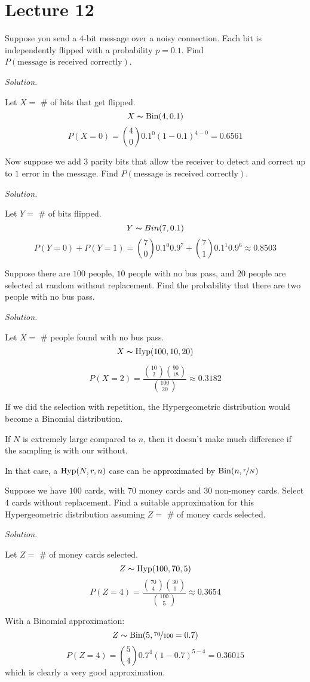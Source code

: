 \section{Lecture 12}

Suppose you send a $ 4 $-bit message over a noisy connection.
Each bit is independently flipped with a probability $ p=0.1 $. Find
$ P(\text{message is received correctly}) $.

\emph{Solution.}

Let $ X= $ \# of bits that get flipped.
\[ X \thicksim \operatorname{Bin}(4,0.1) \]
\[ P(X=0)=\binom{4}{0}0.1^0(1-0.1)^{4-0}=0.6561 \]


Now suppose we add $ 3 $ parity bits that allow the receiver
to detect and correct up to $ 1 $ error in the message. Find
$ P(\text{message is received correctly}) $.

\emph{Solution.}

Let $ Y= $ \# of bits flipped.
\[ Y \thicksim Bin(7,0.1) \]
\[P(Y=0)+P(Y=1)= \binom{7}{0}0.1^0 0.9^7 + \binom{7}{1}0.1^1 0.9^6\approx 0.8503 \]


Suppose there are $ 100 $ people, $ 10 $ people with no bus pass,
and $ 20 $ people are selected at random without replacement. 
Find the probability that there are two people with no bus pass.

\emph{Solution.}

Let $ X= $ \# people found with no bus pass.
\[ X \thicksim \operatorname{Hyp}(100,10,20) \]

\[ P(X=2)=\frac{\binom{10}{2}\binom{90}{18}}{\binom{100}{20}}\approx 0.3182 \]


If we did the selection with repetition, the Hypergeometric distribution
would become a Binomial distribution.

If $ N $ is extremely large compared to $ n $, then it doesn't make much difference
if the sampling is with our without.

In that case, a $ \operatorname{Hyp}(N,r,n) $ case can be approximated by $ \operatorname{Bin}(n,\nicefrac{r}{N}) $


Suppose we have $ 100 $ cards, with $ 70 $ money cards and $ 30 $ non-money cards.
Select $ 4 $ cards without replacement. 
Find a suitable approximation for this Hypergeometric distribution assuming
$ Z= $ \# of money cards selected.

\emph{Solution.}

Let $ Z= $ \# of money cards selected.
\[ Z \thicksim \operatorname{Hyp}(100,70,5) \]
\[ P(Z=4)=\frac{\binom{70}{4}\binom{30}{1}}{\binom{100}{5}}\approx 0.3654 \]

With a Binomial approximation:
\[ Z \thicksim \operatorname{Bin}(5,\nicefrac{70}{100}=0.7) \]
\[ P(Z=4)=\binom{5}{4}0.7^4(1-0.7)^{5-4}= 0.36015 \]
which is clearly a very good approximation.